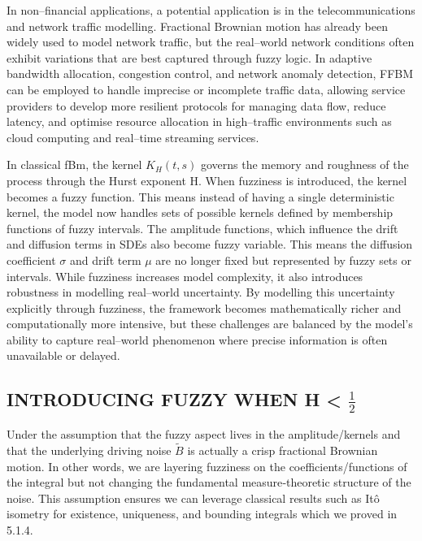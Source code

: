\documentclass[12pt,a4paper]{report}
\numberwithin{equation}{section}
\begin{document}
In non--financial applications, a potential application is in the
telecommunications and network traffic modelling. Fractional Brownian
motion has already been widely used to model network traffic, but the
real--world network conditions often exhibit variations that are best
captured through fuzzy logic. In adaptive bandwidth allocation,
congestion control, and network anomaly detection, FFBM can be employed
to handle imprecise or incomplete traffic data, allowing service
providers to develop more resilient protocols for managing data flow,
reduce latency, and optimise resource allocation in high--traffic
environments such as cloud computing and real--time streaming services.

In classical fBm, the kernel \(K_{H}(t,s)\) governs the memory and
roughness of the process through the Hurst exponent H. When fuzziness is
introduced, the kernel becomes a fuzzy function. This means instead of
having a single deterministic kernel, the model now handles sets of
possible kernels defined by membership functions of fuzzy intervals. The
amplitude functions, which influence the drift and diffusion terms in
SDEs also become fuzzy variable. This means the diffusion coefficient
\emph{$\sigma$} and drift term \emph{$\mu$} are no longer fixed but represented by
fuzzy sets or intervals. While fuzziness increases model complexity, it
also introduces robustness in modelling real--world uncertainty. By
modelling this uncertainty explicitly through fuzziness, the framework
becomes mathematically richer and computationally more intensive, but
these challenges are balanced by the model's ability to capture
real--world phenomenon where precise information is often unavailable or
delayed.

\hypertarget{fuzzy-h-lt-half}{%
\subsection{\texorpdfstring{INTRODUCING FUZZY WHEN H \textless{} $\frac{1}{2}$
}{INTRODUCING FUZZY WHEN H < 1/2}}\label{fuzzy-h-lt-half}}

Under the assumption that the fuzzy aspect lives in the
amplitude/kernels and that the underlying driving noise
\(\widetilde{B}\) is actually a crisp fractional Brownian motion. In
other words, we are layering fuzziness on the coefficients/functions of
the integral but not changing the fundamental measure‐theoretic
structure of the noise. This assumption ensures we can leverage
classical results such as Itô isometry for existence, uniqueness, and
bounding integrals which we proved in 5.1.4.
\end{document}
